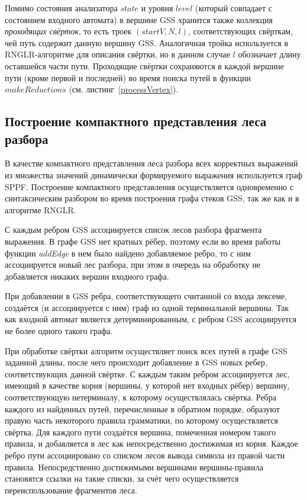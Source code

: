 Помимо состояния анализатора $state$ и уровня $level$ (который совпадает с состоянием входного автомата) в вершине GSS хранится также коллекция \emph{проходящих свёрток}, то есть троек $(startV, N, l)$, соответствующих свёрткам, чей путь содержит данную вершину GSS. Аналогичная тройка используется в RNGLR-алгоритме для описания свёртки, но в данном случае $l$ обозначает длину оставшейся части пути. Проходящие свёртки сохраняются в каждой вершине пути (кроме первой и последней) во время поиска путей в функции $makeReductions$ (см. листинг~\ref{processVertex}).


\subsection{Построение компактного представления леса разбора}

В качестве компактного представления леса разбора всех корректных выражений из множества значений динамически формируемого выражения используется граф SPPF. Построение компактного представления осуществляется одновременно с синтаксическим разбором во время построения графа стеков GSS, так же как и в алгоритме RNGLR.

С каждым ребром GSS ассоциируется список лесов разбора фрагмента выражения. В графе GSS нет кратных рёбер, поэтому если во время работы функции \emph{addEdge} в нем было найдено добавляемое ребро, то с ним ассоциируется новый лес разбора, при этом в очередь на обработку не добавляется никаких вершин входного графа.  

При добавлении в GSS ребра, соответствующего считанной со входа лексеме, создаётся (и ассоциируется с ним) граф из одной терминальной вершины. Так как входной автомат является детерминированным, с ребром GSS ассоциируется не более одного такого графа.

При обработке свёртки алгоритм осуществляет поиск всех путей в графе GSS заданной длины, после чего происходит добавление в GSS новых ребер, соответствующих данной свёртке. С каждым таким ребром ассоциируется лес, имеющий в качестве корня (вершины, у которой нет входных рёбер) вершину, соответствующую нетерминалу, к которому осуществлялась свёртка. Ребра каждого из найденных путей, перечисленные в обратном порядке, образуют правую часть некоторого правила грамматики, по которому осуществляется свёртка. Для каждого пути создаётся вершина, помеченная номером такого правила, и добавляется в лес как непосредственно достижимая из корня. Каждое ребро пути ассоциировано со списком лесов вывода символа из правой части правила. Непосредственно достижимыми вершинами вершины-правила становятся ссылки на такие списки, за счёт чего осуществляется переиспользование фрагментов леса.

